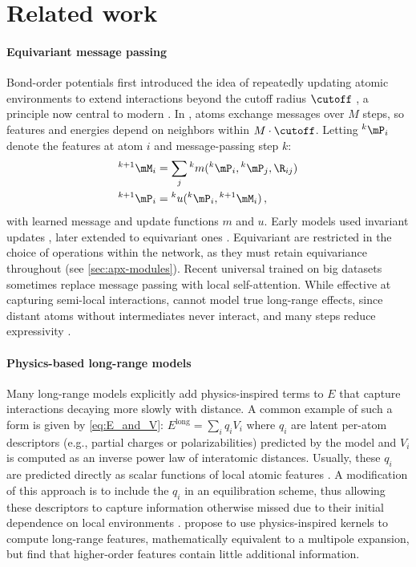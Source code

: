 \documentclass[10pt]{article}
\begin{document}
\section{Related work}
\paragraph{Equivariant message passing}
Bond-order potentials first introduced the idea of repeatedly updating atomic environments to extend interactions beyond the cutoff radius $\cutoff$ \citep{t1988,b1990}, a principle now central to modern \mlps. In \mpnns \citep{gsrvd2017}, atoms exchange messages over $M$ steps, so features and energies depend on neighbors within $M \cdot \cutoff$. Letting ${}^k\mP_i$ denote the features at atom $i$ and message-passing step $k$:
\begin{align}
    {}^{k+1}\mM_{i} &= \sum_j {}^{k}m({}^k\mP_i, {}^k\mP_j, \R_{ij})  \label{eq:message} \\
    {}^{k+1}\mP_i &= {}^{k}u({}^k\mP_i, {}^{k+1}\mM_i) \, , \label{eq:update}
\end{align}
with learned message and update functions $m$ and $u$.
Early models used invariant updates \citep{sksctm2017,xg2018}, later extended to equivariant ones \citep{ggg2019,sug2021,bksoc2022,bmsgmkmsk2022,fumc2024}.
Equivariant \mpnns are restricted in the choice of operations within the network, as they must retain equivariance throughout (see \cref{sec:apx-modules}).
Recent universal \mlps trained on big datasets \citep{bbcwzc2025,wdfgsbagklmscdrsuz2025,mbkptfplc2025pre,rvsggdn2025} sometimes replace message passing with local self-attention. While effective at capturing semi-local interactions, \mpnns cannot model true long-range effects, since distant atoms without intermediates never interact, and many steps reduce expressivity \citep{cw2020,ay2020,npfc2022}.

\paragraph{Physics-based long-range models}
Many long-range models explicitly add physics-inspired terms to $E$ that capture interactions decaying more slowly with distance.
A common example of such a form is given by \cref{eq:E_and_V}: $E^{\mathrm{long}} = \sum_i q_i V_i$  where \( q_i \) are latent per-atom descriptors (e.g., partial charges or polarizabilities) predicted by the model and $V_i$ is computed as an inverse power law of interatomic distances.
Usually, these \( q_i \) are predicted directly as scalar functions of local atomic features \citep{ucgssm2021,shscrm2021,lhhxrhlc2025,kkzc2024,jlx2025,kfdksucmt2025, c2025}.
A modification of this approach is to include the \( q_i \) in an equilibration scheme, thus allowing these descriptors to capture information otherwise missed due to their initial dependence on local environments \citep{kfgb2021,plsk2023,mka2025}.
\citet{gc2019,hlhc2023} propose to use physics-inspired kernels to compute long-range features, mathematically equivalent to a multipole expansion, but find that higher-order features contain little additional information.
\end{document}
